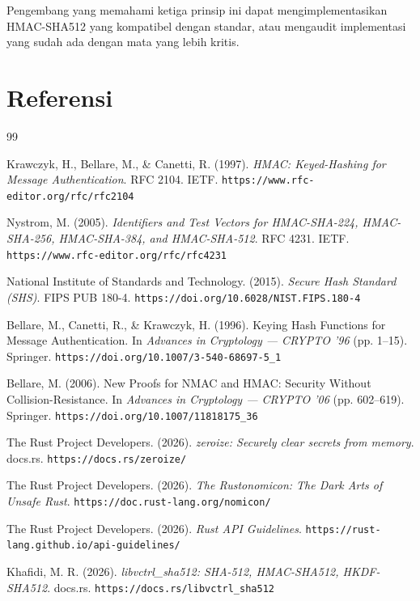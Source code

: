 \documentclass[11pt,a4paper]{article}
\begin{document}
Pengembang yang memahami ketiga prinsip ini dapat mengimplementasikan HMAC-SHA512 yang kompatibel dengan standar, atau mengaudit implementasi yang sudah ada dengan mata yang lebih kritis.

\newpage
\section*{Referensi}

\begin{thebibliography}{99}

	Krawczyk, H., Bellare, M., \& Canetti, R. (1997).
	\textit{HMAC: Keyed-Hashing for Message Authentication}.
	RFC 2104.
	IETF.
	\texttt{https://www.rfc-editor.org/rfc/rfc2104}

	Nystrom, M. (2005).
	\textit{Identifiers and Test Vectors for HMAC-SHA-224, HMAC-SHA-256, HMAC-SHA-384, and HMAC-SHA-512}.
	RFC 4231.
	IETF.
	\texttt{https://www.rfc-editor.org/rfc/rfc4231}

	National Institute of Standards and Technology. (2015).
	\textit{Secure Hash Standard (SHS)}.
	FIPS PUB 180-4.
	\texttt{https://doi.org/10.6028/NIST.FIPS.180-4}

	Bellare, M., Canetti, R., \& Krawczyk, H. (1996).
	Keying Hash Functions for Message Authentication.
	In \textit{Advances in Cryptology --- CRYPTO '96}
	(pp. 1--15). Springer.
	\texttt{https://doi.org/10.1007/3-540-68697-5\_1}

	Bellare, M. (2006).
	New Proofs for NMAC and HMAC: Security Without Collision-Resistance.
	In \textit{Advances in Cryptology --- CRYPTO '06}
	(pp. 602--619). Springer.
	\texttt{https://doi.org/10.1007/11818175\_36}

	The Rust Project Developers. (2026).
	\textit{zeroize: Securely clear secrets from memory}.
	docs.rs.
	\texttt{https://docs.rs/zeroize/}

	The Rust Project Developers. (2026).
	\textit{The Rustonomicon: The Dark Arts of Unsafe Rust}.
	\texttt{https://doc.rust-lang.org/nomicon/}

	The Rust Project Developers. (2026).
	\textit{Rust API Guidelines}.
	\texttt{https://rust-lang.github.io/api-guidelines/}

	Khafidi, M. R. (2026).
	\textit{libvctrl\_sha512: SHA-512, HMAC-SHA512, HKDF-SHA512}.
	docs.rs.
	\texttt{https://docs.rs/libvctrl\_sha512}


\end{thebibliography}
\end{document}
